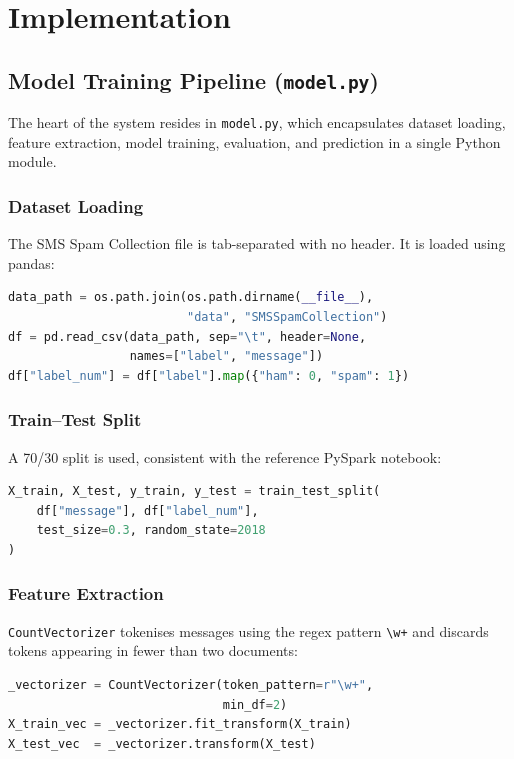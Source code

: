 \documentclass[paper=a4, fontsize=11pt]{scrartcl}
\numberwithin{equation}{section}
\numberwithin{figure}{section}
\numberwithin{table}{section}
\begin{document}
\section{Implementation}

\subsection{Model Training Pipeline (\texttt{model.py})}
The heart of the system resides in \texttt{model.py}, which encapsulates dataset loading, feature extraction, model training, evaluation, and prediction in a single Python module.

\subsubsection{Dataset Loading}
The SMS Spam Collection file is tab-separated with no header.  It is loaded using pandas:
\begin{lstlisting}[language=Python, caption={Loading the dataset}]
data_path = os.path.join(os.path.dirname(__file__),
                         "data", "SMSSpamCollection")
df = pd.read_csv(data_path, sep="\t", header=None,
                 names=["label", "message"])
df["label_num"] = df["label"].map({"ham": 0, "spam": 1})
\end{lstlisting}

\subsubsection{Train–Test Split}
A 70/30 split is used, consistent with the reference PySpark notebook:
\begin{lstlisting}[language=Python, caption={Splitting the data}]
X_train, X_test, y_train, y_test = train_test_split(
    df["message"], df["label_num"],
    test_size=0.3, random_state=2018
)
\end{lstlisting}

\subsubsection{Feature Extraction}
\texttt{CountVectorizer} tokenises messages using the regex pattern \verb|\w+| and discards tokens appearing in fewer than two documents:
\begin{lstlisting}[language=Python, caption={CountVectorizer configuration}]
_vectorizer = CountVectorizer(token_pattern=r"\w+",
                              min_df=2)
X_train_vec = _vectorizer.fit_transform(X_train)
X_test_vec  = _vectorizer.transform(X_test)
\end{lstlisting}
\end{document}
